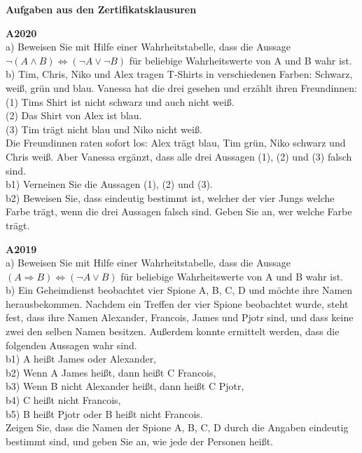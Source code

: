 \documentclass[landscape,twocolumn,a4paper]{article}
\begin{document}
\parindent 0mm

\textbf{Aufgaben aus den Zertifikatsklausuren}
\bigskip

\textbf{A2020} \\

a) Beweisen Sie mit Hilfe einer Wahrheitstabelle, dass die Aussage $ \lnot(A \land B) \Leftrightarrow (\lnot A \lor \lnot B)$ für beliebige Wahrheitswerte von A und B wahr ist. \\


b) Tim, Chris, Niko und Alex tragen T-Shirts in verschiedenen Farben: Schwarz, weiß, grün und
blau. Vanessa hat die drei gesehen und erzählt ihren Freundinnen: \\
(1) Tims Shirt ist nicht schwarz und auch nicht weiß. \\
(2) Das Shirt von Alex ist blau. \\
(3) Tim trägt nicht blau und Niko nicht weiß. \\
Die Freundinnen raten sofort los: Alex trägt blau, Tim grün, Niko schwarz und Chris weiß.
Aber Vanessa ergänzt, dass alle drei Aussagen (1), (2) und (3) falsch sind. \\

b1) Verneinen Sie die Aussagen (1), (2) und (3). \\
b2) Beweisen Sie, dass eindeutig bestimmt ist, welcher der vier Jungs welche Farbe trägt,
wenn die drei Aussagen falsch sind. Geben Sie an, wer welche Farbe trägt.
\bigskip 

\textbf{A2019} \\

a) Beweisen Sie mit Hilfe einer Wahrheitstabelle, 
dass die Aussage $(A \Rightarrow B) \Leftrightarrow (\lnot A \lor B) $
für beliebige Wahrheitswerte von A und B wahr ist. \\

b) Ein Geheimdienst beobachtet vier Spione A, B, C, D und möchte ihre Namen herausbekommen.
Nachdem ein Treffen der vier Spione beobachtet wurde, steht fest, dass ihre Namen
Alexander, Francois, James und Pjotr sind, und dass keine zwei den selben Namen besitzen.
Außerdem konnte ermittelt werden, dass die folgenden Aussagen wahr sind. \\

b1) A heißt James oder Alexander, \\
b2) Wenn A James heißt, dann heißt C Francois, \\
b3) Wenn B nicht Alexander heißt, dann heißt C Pjotr, \\
b4) C heißt nicht Francois, \\
b5) B heißt Pjotr oder B heißt nicht Francois. \\
Zeigen Sie, dass die Namen der Spione A, B, C, D durch
die Angaben eindeutig bestimmt
sind, und geben Sie an, wie jede der Personen heißt.
\bigskip 
\end{document}
